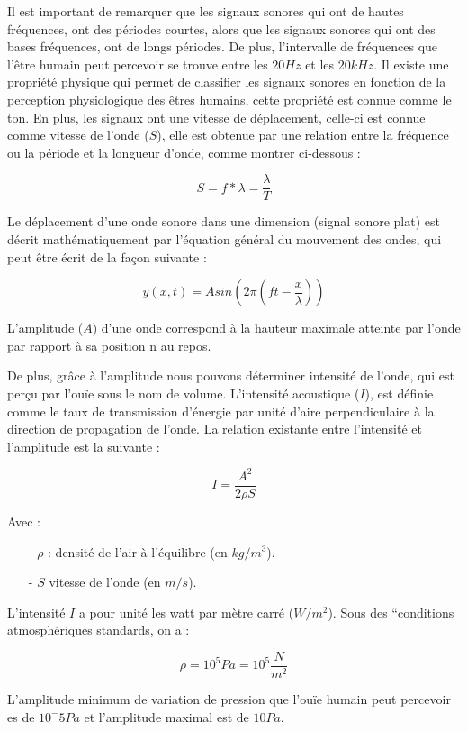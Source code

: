 \documentclass[conference,onecolumn]{IEEEtran}
\begin{document}
Il est important de remarquer que les signaux sonores qui ont de hautes fréquences, ont des périodes courtes, alors que les signaux sonores qui ont des bases fréquences, ont de longs périodes. De plus, l’intervalle de fréquences que l’être humain peut percevoir se trouve entre les $20Hz$ et les $20 kHz$. Il existe une propriété physique qui permet de classifier les signaux sonores en fonction de la perception physiologique des êtres humains, cette propriété est connue comme le ton. En plus, les signaux ont une vitesse de déplacement, celle-ci est connue comme vitesse de l’onde ($S$), elle est obtenue par une relation entre la fréquence ou la période et la longueur d’onde, comme montrer ci-dessous : 

\[S = f*\lambda = \dfrac{\lambda}{T}\]

Le déplacement d’une onde sonore dans une dimension (signal sonore plat) est décrit mathématiquement par l’équation général du mouvement des ondes, qui peut être écrit de la façon suivante :  
 
\[y(x,t) = Asin(2\pi(ft - \dfrac{x}{\lambda}))\]

L'amplitude ($A$) d'une onde correspond à la hauteur maximale atteinte par l'onde par rapport à sa position n au repos. 

De plus, grâce à l’amplitude nous pouvons déterminer intensité de l’onde, qui est perçu par l’ouïe sous le nom de volume. L'intensité acoustique ($I$), est définie comme le taux de transmission d'énergie par unité d’aire perpendiculaire à la direction de propagation de l’onde. La relation existante entre l’intensité et l’amplitude est la suivante : 

\[I = \dfrac{A^2}{2\rho S}\]

Avec :

\begin{itemize} %

    \item[-] $\rho$ : densité de l’air à l’équilibre (en $kg/m^3$).
    \item[-] $S$ vitesse de l’onde (en $m/s$).

\end{itemize}

L’intensité $I$ a pour unité les watt par mètre carré ($W/m^2$). Sous des “conditions atmosphériques standards, on a : 

\[\rho=10^5 Pa=10^5 \dfrac{N}{m^2}\]

L’amplitude minimum de variation de pression que l’ouïe humain peut percevoir es de $10^-5 Pa$ et l’amplitude maximal est de $10 Pa$. 
\end{document}
